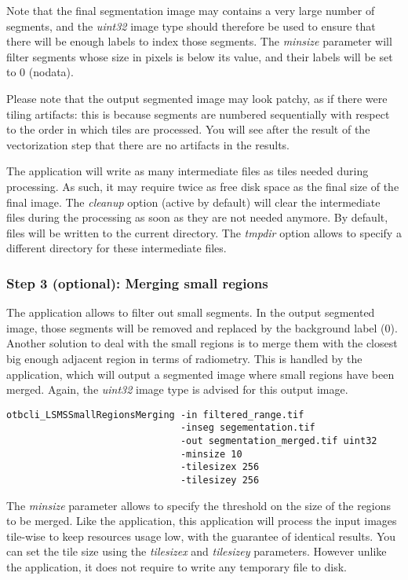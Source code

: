 Note that the final segmentation image may contains a very large
number of segments, and the \emph{uint32} image type should
therefore be used to ensure that there will be enough labels to index
those segments. The \emph{minsize} parameter will filter segments
whose size in pixels is below its value, and their labels will be set
to 0 (nodata). 

Please note that the output segmented image may look patchy, as if
there were tiling artifacts: this is because segments are numbered
sequentially with respect to the order in which tiles are
processed. You will see after the result of the vectorization step
that there are no artifacts in the results.

The  application will write as many
intermediate files as tiles needed during processing. As such, it may
require twice as free disk space as the final size of the final
image. The \emph{cleanup} option (active by default) will clear the
intermediate files during the processing as soon as they are not
needed anymore. By default, files will be written to the current
directory. The \emph{tmpdir} option allows to specify a different
directory for these intermediate files.

\subsubsection{Step 3 (optional): Merging small regions}

The  application allows to filter out
small segments. In the output segmented image, those segments will be
removed and replaced by the background label (0). Another solution to
deal with the small regions is to merge them with the closest big
enough adjacent region in terms of radiometry. This is handled by the
 application, which will output a
segmented image where small regions have been merged. Again, the
\emph{uint32} image type is advised for this output image.

\begin{verbatim}
otbcli_LSMSSmallRegionsMerging -in filtered_range.tif
                               -inseg segementation.tif
                               -out segmentation_merged.tif uint32 
                               -minsize 10 
                               -tilesizex 256 
                               -tilesizey 256
\end{verbatim}

The \emph{minsize} parameter allows to specify the threshold on the
size of the regions to be merged. Like the 
application, this application will process the input images tile-wise
to keep resources usage low, with the guarantee of identical
results. You can set the tile size using the \emph{tilesizex} and
\emph{tilesizey} parameters. However unlike the
 application, it does not require to
write any temporary file to disk.

